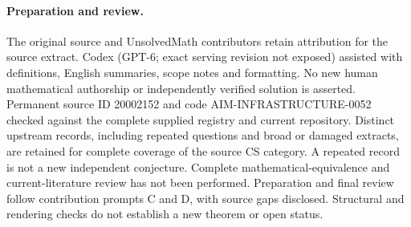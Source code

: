 \documentclass[11pt]{article}
\begin{document}
\paragraph{Preparation and review.}
The original source and UnsolvedMath contributors retain attribution for the source extract. Codex (GPT-6; exact serving revision not exposed) assisted with definitions, English summaries, scope notes and formatting. No new human mathematical authorship or independently verified solution is asserted. Permanent source ID 20002152 and code AIM-INFRASTRUCTURE-0052 checked against the complete supplied registry and current repository. Distinct upstream records, including repeated questions and broad or damaged extracts, are retained for complete coverage of the source CS category. A repeated record is not a new independent conjecture. Complete mathematical-equivalence and current-literature review has not been performed. Preparation and final review follow contribution prompts C and D, with source gaps disclosed. Structural and rendering checks do not establish a new theorem or open status.
\label{end:20002152}
\end{document}
